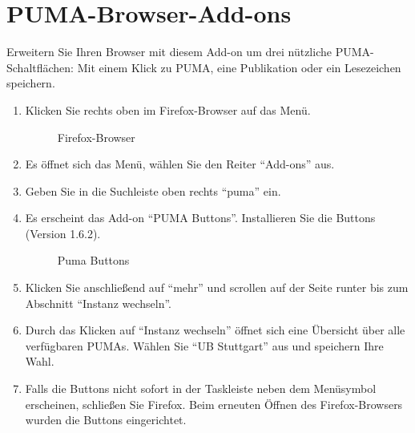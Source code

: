 \section{PUMA-Browser-Add-ons}\label{sec:addon}
Erweitern Sie Ihren Browser mit diesem Add-on um drei nützliche PUMA-Schaltflächen: Mit einem Klick zu PUMA, eine Publikation oder ein Lesezeichen speichern.\newline
\begin{enumerate}
\item Klicken Sie rechts oben im Firefox-Browser auf das Menü.
\begin{figure}[h!]
 \centering
 \caption{Firefox-Browser}
 \label{fig:firefoxBrowser}
\end{figure} 
\item Es öffnet sich das Menü, wählen Sie den Reiter \enquote{Add-ons} aus. 
\item Geben Sie in die Suchleiste oben rechts \enquote{puma} ein.
\item Es erscheint das Add-on \enquote{PUMA Buttons}. Installieren Sie die Buttons (Version 1.6.2).
\begin{figure}[h!]
 \centering
 \caption{Puma Buttons}
 \label{fig:pumaButtons}
\end{figure} 
\item Klicken Sie anschließend auf \enquote{mehr} und scrollen auf der Seite runter bis zum Abschnitt \enquote{Instanz wechseln}. 
\item Durch das Klicken auf \enquote{Instanz wechseln} öffnet sich eine Übersicht über alle verfügbaren PUMAs. Wählen Sie  \enquote{UB Stuttgart} aus und speichern Ihre Wahl.
\item Falls die Buttons nicht sofort in der Taskleiste neben dem Menüsymbol  erscheinen, schließen Sie Firefox. Beim erneuten Öffnen des Firefox-Browsers wurden die Buttons eingerichtet.
\end{enumerate}
